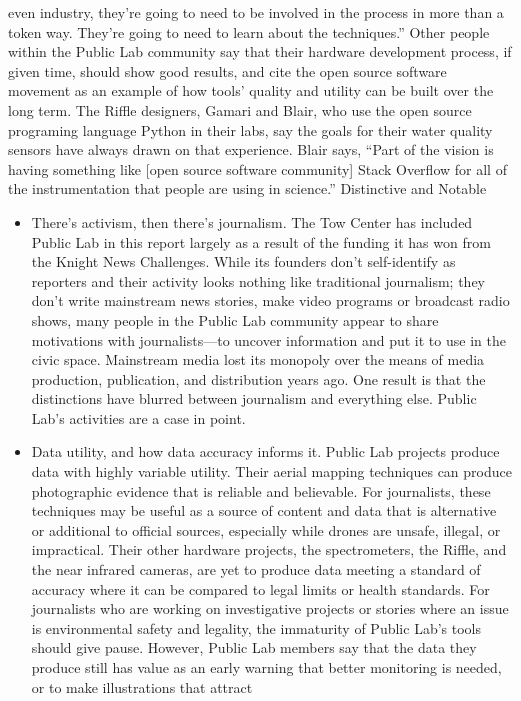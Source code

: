 even industry, they're going to need to be involved in the process
in more than a token way. They're going to need to learn about
the techniques.''
Other people within the Public Lab community say that their hardware
development process, if given time, should show good results, and cite the
open source software movement as an example of how tools' quality and
utility can be built over the long term. The Riffle designers, Gamari and
Blair, who use the open source programing language Python in their labs,
say the goals for their water quality sensors have always drawn on that experience.
Blair says, ``Part of the vision is having something like [open source
software community] Stack Overflow for all of the instrumentation that
people are using in science.''
Distinctive and Notable
\begin{itemize}
\item There's activism, then there's journalism.
The Tow Center has included Public Lab in this report largely as a
result of the funding it has won from the Knight News Challenges.
While its founders don't self-identify as reporters and their activity
looks nothing like traditional journalism; they don't write mainstream
news stories, make video programs or broadcast radio shows, many
people in the Public Lab community appear to share motivations
with journalists—to uncover information and put it to use in the civic
space. Mainstream media lost its monopoly over the means of media
production, publication, and distribution years ago. One result is that
the distinctions have blurred between journalism and everything else.
Public Lab's activities are a case in point.
\item Data utility, and how data accuracy informs it.
Public Lab projects produce data with highly variable utility. Their
aerial mapping techniques can produce photographic evidence that is
reliable and believable. For journalists, these techniques may be useful
as a source of content and data that is alternative or additional to official
sources, especially while drones are unsafe, illegal, or impractical.
Their other hardware projects, the spectrometers, the Riffle, and the
near infrared cameras, are yet to produce data meeting a standard of
accuracy where it can be compared to legal limits or health standards.
For journalists who are working on investigative projects or stories
where an issue is environmental safety and legality, the immaturity
of Public Lab's tools should give pause. However, Public Lab members
say that the data they produce still has value as an early warning
that better monitoring is needed, or to make illustrations that attract

\end{itemize}
